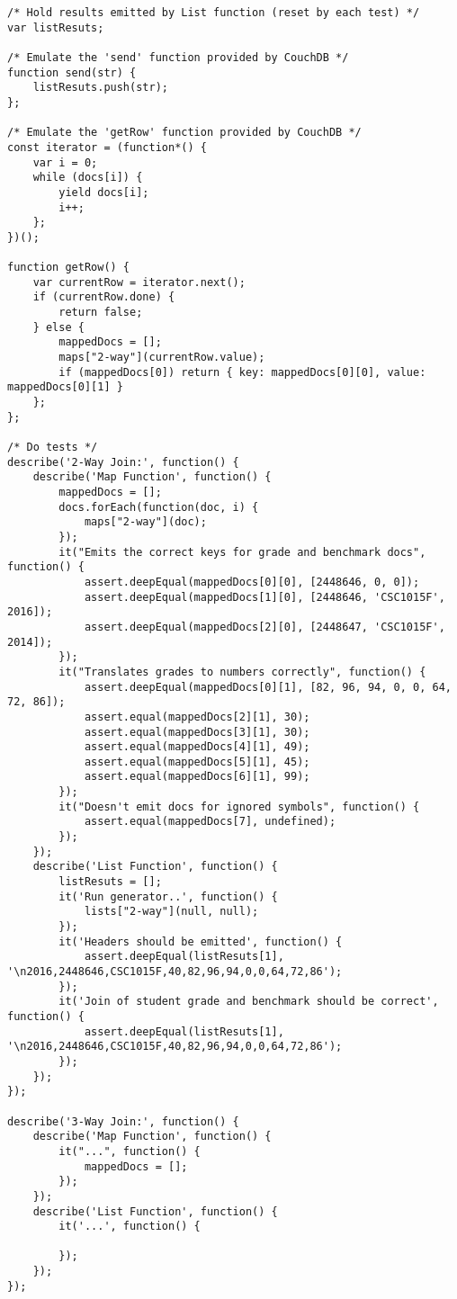 \begin{verbatim}
/* Hold results emitted by List function (reset by each test) */
var listResuts;

/* Emulate the 'send' function provided by CouchDB */
function send(str) {
    listResuts.push(str);
};

/* Emulate the 'getRow' function provided by CouchDB */
const iterator = (function*() {
    var i = 0;
    while (docs[i]) {
        yield docs[i];
        i++;
    };
})();

function getRow() {
    var currentRow = iterator.next();
    if (currentRow.done) {
        return false;
    } else {
        mappedDocs = [];
        maps["2-way"](currentRow.value);
        if (mappedDocs[0]) return { key: mappedDocs[0][0], value: mappedDocs[0][1] }
    };
};

/* Do tests */
describe('2-Way Join:', function() {
    describe('Map Function', function() {
        mappedDocs = [];
        docs.forEach(function(doc, i) {
            maps["2-way"](doc);
        });
        it("Emits the correct keys for grade and benchmark docs", function() {
            assert.deepEqual(mappedDocs[0][0], [2448646, 0, 0]);
            assert.deepEqual(mappedDocs[1][0], [2448646, 'CSC1015F', 2016]);
            assert.deepEqual(mappedDocs[2][0], [2448647, 'CSC1015F', 2014]);
        });
        it("Translates grades to numbers correctly", function() {
            assert.deepEqual(mappedDocs[0][1], [82, 96, 94, 0, 0, 64, 72, 86]);
            assert.equal(mappedDocs[2][1], 30);
            assert.equal(mappedDocs[3][1], 30);
            assert.equal(mappedDocs[4][1], 49);
            assert.equal(mappedDocs[5][1], 45);
            assert.equal(mappedDocs[6][1], 99);
        });
        it("Doesn't emit docs for ignored symbols", function() {
            assert.equal(mappedDocs[7], undefined);
        });
    });
    describe('List Function', function() {
        listResuts = [];
        it('Run generator..', function() {
            lists["2-way"](null, null);
        });
        it('Headers should be emitted', function() {
            assert.deepEqual(listResuts[1], '\n2016,2448646,CSC1015F,40,82,96,94,0,0,64,72,86');
        });
        it('Join of student grade and benchmark should be correct', function() {
            assert.deepEqual(listResuts[1], '\n2016,2448646,CSC1015F,40,82,96,94,0,0,64,72,86');
        });
    });
});

describe('3-Way Join:', function() {
    describe('Map Function', function() {
        it("...", function() {
            mappedDocs = [];
        });
    });
    describe('List Function', function() {
        it('...', function() {

        });
    });
});
\end{verbatim}